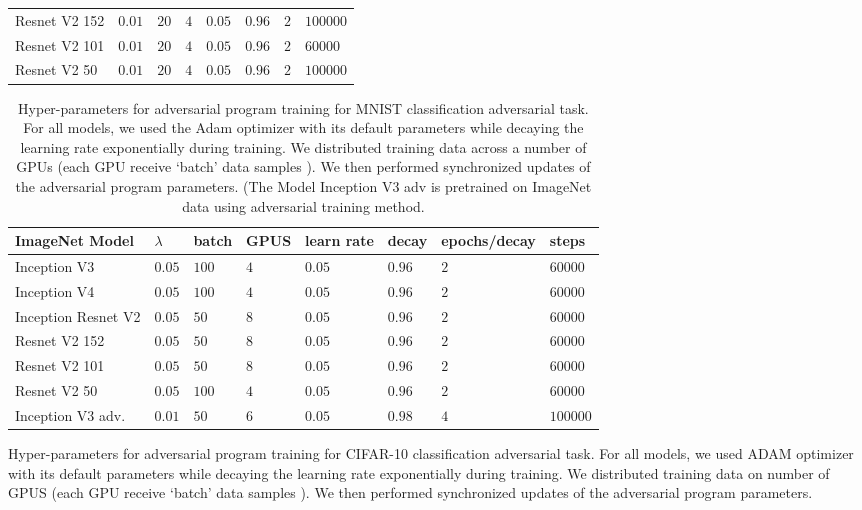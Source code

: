 \documentclass{article}
\begin{document}
\begin{table}
\begin{tabular}{llllllll}
    Resnet V2 152            & $0.01$ & $20$  & $4$  &  $0.05$ & $0.96$ & $2$ & $100000$  \\
    Resnet V2 101           & $0.01$ & $20$  & $4$  &  $0.05$ & $0.96$ & $2$ & $60000$  \\
    Resnet V2 50           & $0.01$ & $20$  & $4$  &  $0.05$ & $0.96$ & $2$ & $100000$  \\
    \bottomrule
  \end{tabular}
\end{table}\begin{table}
  \caption{Hyper-parameters for adversarial program training for MNIST classification adversarial task. For all models, we used the Adam optimizer with its default parameters while decaying the learning rate exponentially during training.  We distributed training data across a number of GPUs (each GPU receive `batch' data samples ). We then performed synchronized updates of the adversarial program parameters. (The Model Inception V3 adv is pretrained on ImageNet data using adversarial training method.}
  \label{table: hyperparams mnist}
  \centering
  \begin{tabular}{llllllll}
    \toprule
     ImageNet Model &  $\lambda$ & batch & GPUS & learn rate & decay & epochs/decay & steps \\
     \midrule
    Inception V3                 & $0.05$ & $100$  & $4$  &  $0.05$ & $0.96$ & $2$ & $60000$  \\
    Inception V4                & $0.05$ & $100$  & $4$  &  $0.05$ & $0.96$ & $2$ & $60000$  \\
    Inception Resnet V2    & $0.05$ & $50$  & $8$  &  $0.05$ & $0.96$ & $2$ & $60000$  \\
    Resnet V2 152            & $0.05$ & $50$  & $8$  &  $0.05$ & $0.96$ & $2$ & $60000$  \\
    Resnet V2 101           & $0.05$ & $50$  & $8$  &  $0.05$ & $0.96$ & $2$ & $60000$  \\
    Resnet V2 50           & $0.05$ & $100$  & $4$  &  $0.05$ & $0.96$ & $2$ & $60000$  \\
    Inception V3 adv.        & $0.01$ & $50$  & $6$  &  $0.05$ & $0.98$ & $4$ & $100000$  \\
    \bottomrule
  \end{tabular}
\end{table}\begin{table}
  \caption{Hyper-parameters for adversarial program training for CIFAR-10 classification adversarial task. For all models, we used ADAM optimizer with its default parameters while decaying the learning rate exponentially during training.  We distributed training data on number of GPUS (each GPU receive `batch' data samples ). We then performed synchronized updates of the adversarial program parameters.}

\end{table}
\end{document}
